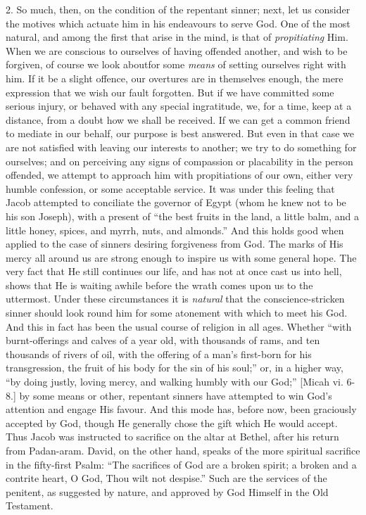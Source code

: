2. So much, then, on the condition of the repentant sinner; next,
let us consider the motives which actuate him in his endeavours to
serve God. One of the most natural, and among the first that arise in
the mind, is that of \emph{propitiating} Him. When we are conscious to
ourselves of having offended another, and wish to be forgiven, of
course we look about\emph{}for some \emph{means} of setting ourselves
right with him. If it be a slight offence, our overtures are in
themselves enough, the mere expression that we wish our fault
forgotten. But if we have committed some serious injury, or behaved
with any special ingratitude, we, for a time, keep at a distance, from
a doubt how we shall be received. If we can get a common friend to
mediate in our behalf, our purpose is best answered. But even in that
case we are not satisfied with leaving our interests to another; we
try to do something for ourselves; and on perceiving any signs of
compassion or placability in the person offended, we attempt to
approach him with propitiations of our own, either very humble
confession, or some acceptable service. It was under this feeling that
Jacob attempted to conciliate the governor of Egypt (whom he knew not
to be his son Joseph), with a present of ``the best fruits in the
land, a little balm, and a little honey, spices, and myrrh, nuts, and
almonds.'' And this holds good when applied to the case of sinners
desiring forgiveness from God. The marks of His mercy all around us
are strong enough to inspire us with some general hope. The very fact
that He still continues our life, and has not at once cast us into
hell, shows that He is waiting awhile before the wrath comes upon us
to the uttermost. Under these circumstances it is \emph{natural} that
the conscience-stricken sinner should look round him for some
atonement with which to meet his God. And this in fact has been the
usual course of religion in all ages. Whether ``with
burnt-offerings and calves of a year old, with thousands of rams, and
ten thousands of rivers of oil, with the offering of a man's
first-born for his transgression, the fruit of his body for the sin of
his soul;'' or, in a higher way, ``by doing justly, loving
mercy, and walking humbly with our God;'' [Micah vi. 6-8.] by some
means or other, repentant sinners have attempted to win God's
attention and engage His favour. And this mode has, before now, been
graciously accepted by God, though He generally chose the gift which
He would accept. Thus Jacob was instructed to sacrifice on the altar
at Bethel, after his return from Padan-aram. David, on the other hand,
speaks of the more spiritual sacrifice in the fifty-first Psalm:
``The sacrifices of God are a broken spirit; a broken and a
contrite heart, O God, Thou wilt not despise.'' Such are the
services of the penitent, as suggested by nature, and approved by God
Himself in the Old Testament.

